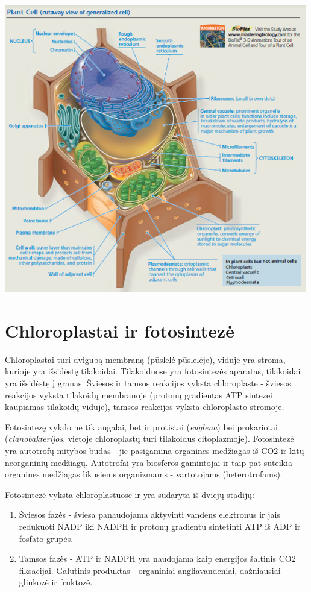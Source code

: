 \documentclass[]{book}
\providecommand{\tightlist}{%
  \setlength{\itemsep}{0pt}\setlength{\parskip}{0pt}}
\begin{document}
\includegraphics[width=500px]{static/augalai/plant_cell}

\hypertarget{chloroplastai-ir-fotosinteze}{%
\section{Chloroplastai ir fotosintezė}\label{chloroplastai-ir-fotosinteze}}

Chloroplastai turi dvigubą membraną (pūslelė pūslelėje), viduje yra stroma, kurioje yra išsidėstę tilakoidai. Tilakoiduose yra fotosintezės aparatas, tilakoidai yra išsidėstę į granas. Šviesos ir tamsos reakcijos vyksta chloroplaste - šviesos reakcijos vyksta tilakoidų membranoje (protonų gradientas ATP sintezei kaupiamas tilakoidų viduje), tamsos reakcijos vyksta chloroplasto stromoje.

Fotosintezę vykdo ne tik augalai, bet ir protistai (\emph{euglena}) bei prokariotai (\emph{cianobakterijos}, vietoje chloroplastų turi tilakoidus citoplazmoje). Fotosintezė yra autotrofų mitybos būdas - jie pasigamina organines medžiagas iš CO2 ir kitų neorganinių medžiagų. Autotrofai yra biosferos gamintojai ir taip pat suteikia organines medžiagas likusiems organizmams - vartotojams (heterotrofams).

Fotosintezė vyksta chloroplastuose ir yra sudaryta iš dviejų stadijų:

\begin{enumerate}
\def\labelenumi{\arabic{enumi}.}
\tightlist
\item
  Šviesos fazės - šviesa panaudojama aktyvinti vandens elektronus ir jais redukuoti NADP iki NADPH ir protonų gradientu sintetinti ATP iš ADP ir fosfato grupės.
\item
  Tamsos fazės - ATP ir NADPH yra naudojama kaip energijos šaltinis CO2 fiksacijai. Galutinis produktas - organiniai angliavandeniai, dažniausiai gliukozė ir fruktozė.
\end{enumerate}
\end{document}
